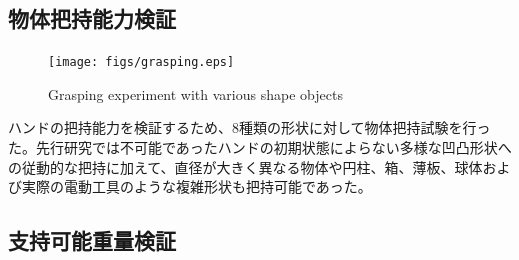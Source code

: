\documentclass{jarticle}
\begin{document}
\subsection{物体把持能力検証}
\vspace{-2mm}
\begin{figure}[h]
  \centering
  \texttt{[image: figs/grasping.eps]}
  \caption{Grasping experiment with various shape objects}
  \vspace{-2mm}
  \label{fig:zissou}
\end{figure}
ハンドの把持能力を検証するため、8種類の形状に対して物体把持試験を行った。先行研究では不可能であったハンドの初期状態によらない多様な凹凸形状への従動的な把持に加えて、直径が大きく異なる物体や円柱、箱、薄板、球体および実際の電動工具のような複雑形状も把持可能であった。
\subsection{支持可能重量検証}
\end{document}

